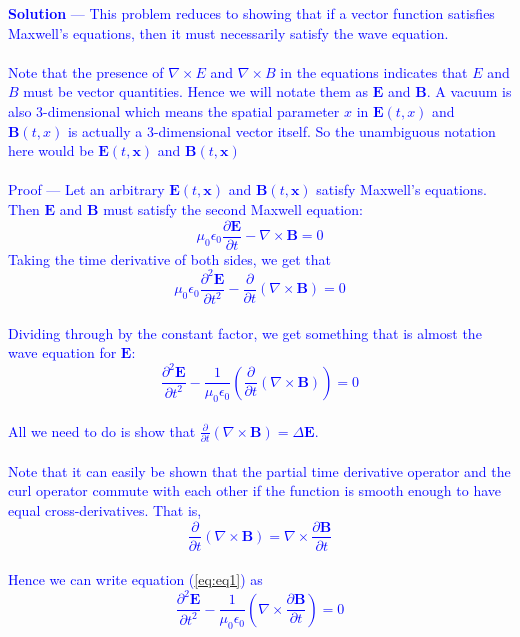 \documentclass[12pt]{article}
\begin{document}
\textcolor{blue}{\textbf{Solution} — This problem reduces to showing that if a vector function satisfies Maxwell's equations, then it must necessarily satisfy the wave equation. \\ \\ Note that the presence of $\nabla \times E$ and $\nabla \times B$ in the equations indicates that $E$ and $B$ must be vector quantities. Hence we will notate them as $\mathbf{E}$ and $\mathbf{B}$. A vacuum is also $3$-dimensional which means the spatial parameter $x$ in $\mathbf{E}(t,x)$ and $\mathbf{B}(t,x)$ is actually a $3$-dimensional vector itself. So the unambiguous notation here would be $\mathbf{E}(t, \mathbf{x})$ and $\mathbf{B}(t, \mathbf{x})$  \\ \\ Proof — Let an arbitrary $\mathbf{E}(t, \mathbf{x})$ and $\mathbf{B}(t, \mathbf{x})$ satisfy Maxwell's equations. Then $\mathbf{E}$ and $\mathbf{B}$ must satisfy the second Maxwell equation: 
$$\mu_0 \epsilon_0 \frac{\partial \mathbf{E}}{\partial t} - \nabla \times \mathbf{B} = 0$$
Taking the time derivative of both sides, we get that
$$\mu_0 \epsilon_0 \frac{\partial^2 \mathbf{E}}{\partial t^2} - \frac{\partial }{\partial t} \left(  \nabla \times \mathbf{B} \right) = 0$$ \\
Dividing through by the constant factor, we get something that is almost the wave equation for $\mathbf{E}$:
\begin{equation}
\label{eq:eq1}
\frac{\partial^2 \mathbf{E}}{\partial t^2} - \frac{1}{\mu_0 \epsilon_0} \left( \frac{\partial }{\partial t} \left(  \nabla \times \mathbf{B} \right) \right) = 0
\end{equation} \\
All we need to do is show that $\frac{\partial }{\partial t} \left(  \nabla \times \mathbf{B} \right) = \Delta \mathbf{E}$. \\ \\ Note that it can easily be shown that the partial time derivative operator and the curl operator commute with each other if the function is smooth enough to have equal cross-derivatives. That is, 
$$\frac{\partial }{\partial t} \left( \nabla \times \mathbf{B} \right) = \nabla \times \frac{\partial \mathbf{B}}{\partial t}$$ \\
Hence we can write equation (\ref{eq:eq1}) as \\
$$\frac{\partial^2 \mathbf{E}}{\partial t^2} - \frac{1}{\mu_0 \epsilon_0} \left( \nabla \times \frac{\partial \mathbf{B}}{\partial t} \right) = 0$$ \\
}
\end{document}
